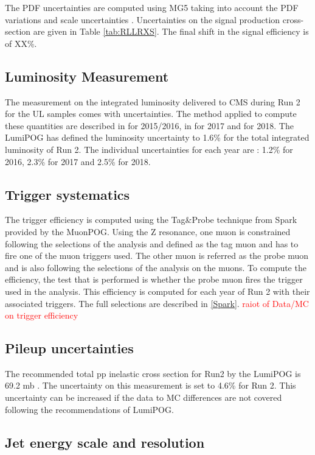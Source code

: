 \documentclass{cernatlasnote}
\begin{document}
        The PDF uncertainties are computed using MG5 taking into account the PDF variations and scale uncertainties \cite{HowToPDF}.
        Uncertainties on the signal production cross-section are given in Table \ref{tab:RLLRXS}. The final shift in the signal efficiency is of XX\%.
    \pagebreak
    \subsection{Luminosity Measurement}
        The measurement on the integrated luminosity delivered to CMS during Run 2 for the UL samples comes with uncertainties. The method applied to compute these quantities are described in \cite{Sirunyan_2021} for 2015/2016, in \cite{CMS:LUM-17-004} for 2017 and \cite{CMS-PAS-LUM-18-002} for 2018. The LumiPOG has defined the luminosity uncertainty to 1.6\% for the total integrated luminosity of Run 2. The individual uncertainties for each year are : 1.2\% for 2016, 2.3\% for 2017 and 2.5\% for 2018.
    \pagebreak
    \subsection{Trigger systematics}
        The trigger efficiency is computed using the Tag\&Probe technique from Spark provided by the MuonPOG. Using the Z resonance, one muon is constrained following the selections of the analysis and defined as the tag muon and has to fire one of the muon triggers used. The other muon is referred as the probe muon and is also following the selections of the analysis on the muons. To compute the efficiency, the test that is performed is whether the probe muon fires the trigger used in the analysis. This efficiency is computed for each year of Run 2 with their associated triggers. The full selections are described in \ref{Spark}. \textcolor{red}{raiot of Data/MC on trigger efficiency}
    \pagebreak
    \subsection{Pileup uncertainties}
        The recommended total pp inelastic cross section for Run2 by the LumiPOG is 69.2 mb \cite{PileupSystematicErrors}. The uncertainty on this measurement is set to 4.6\% for Run 2. This uncertainty can be increased if the data to MC differences are not covered following the recommendations of LumiPOG.
    \pagebreak
    \subsection{Jet energy scale and resolution}
\end{document}
